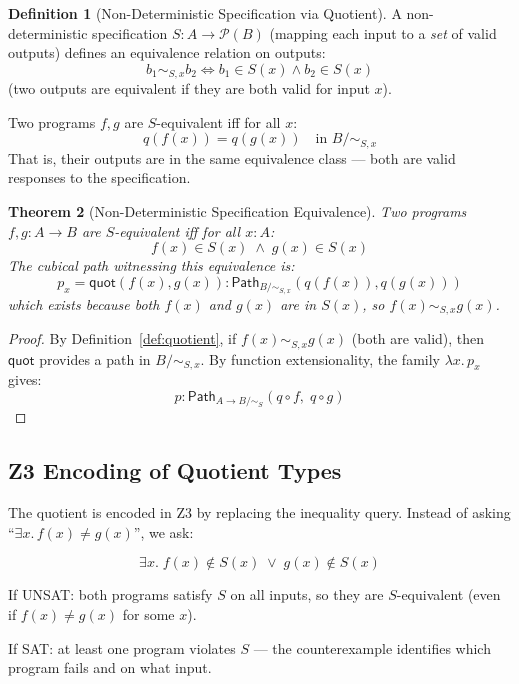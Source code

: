 \documentclass[11pt,a4paper]{report}
\theoremstyle{definition}
\newtheorem{definition}{Definition}[chapter]
\theoremstyle{plain}
\newtheorem{theorem}[definition]{Theorem}
\newcommand{\Path}{\mathsf{Path}}
\begin{document}
\begin{definition}[Non-Deterministic Specification via Quotient]
\label{def:nondet-spec}
A non-deterministic specification $S : A \to \mathcal{P}(B)$ (mapping
each input to a \emph{set} of valid outputs) defines an equivalence
relation on outputs:
\[
  b_1 \sim_{S,x} b_2 \iff b_1 \in S(x) \land b_2 \in S(x)
\]
(two outputs are equivalent if they are both valid for input $x$).

Two programs $f, g$ are $S$-equivalent iff for all $x$:
\[
  q(f(x)) = q(g(x)) \quad \text{in } B / {\sim_{S,x}}
\]
That is, their outputs are in the same equivalence class --- both
are valid responses to the specification.
\end{definition}

\begin{theorem}[Non-Deterministic Specification Equivalence]
\label{thm:nondet-equiv}
Two programs $f, g : A \to B$ are $S$-equivalent iff for all $x : A$:
\[
  f(x) \in S(x) \;\land\; g(x) \in S(x)
\]
The cubical path witnessing this equivalence is:
\[
  p_x = \mathsf{quot}(f(x), g(x)) : \Path_{B/{\sim_{S,x}}}(q(f(x)), q(g(x)))
\]
which exists because both $f(x)$ and $g(x)$ are in $S(x)$, so
$f(x) \sim_{S,x} g(x)$.
\end{theorem}

\begin{proof}
By Definition~\ref{def:quotient}, if $f(x) \sim_{S,x} g(x)$ (both
are valid), then $\mathsf{quot}$ provides a path in $B / {\sim_{S,x}}$.
By function extensionality, the family $\lambda x.\, p_x$ gives:
\[
  p : \Path_{A \to B/{\sim_S}}(q \circ f, \; q \circ g)
\]
\end{proof}

\subsection{Z3 Encoding of Quotient Types}

The quotient is encoded in Z3 by replacing the inequality query.
Instead of asking ``$\exists x.\, f(x) \neq g(x)$'', we ask:

\[
  \exists x.\; f(x) \notin S(x) \;\lor\; g(x) \notin S(x)
\]

If UNSAT: both programs satisfy $S$ on all inputs, so they are
$S$-equivalent (even if $f(x) \neq g(x)$ for some $x$).

If SAT: at least one program violates $S$ --- the counterexample
identifies which program fails and on what input.
\end{document}
